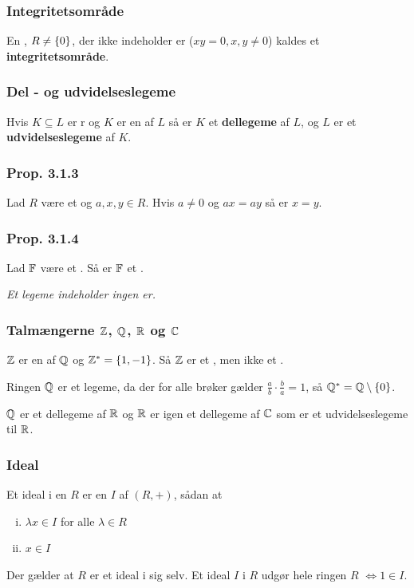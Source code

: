 \subsubsection{Integritetsområde}
\label{Integritetsomraade}
En , $R \neq \{ 0 \}$, der ikke indeholder
er ($xy = 0, x, y \neq 0$) kaldes et
\textbf{integritetsområde}.

\subsubsection{Del - og udvidelseslegeme}
\label{Del - og udvidelseslegeme}
Hvis $K \subseteq L$ er r og $K$ er en  af $L$
så er $K$ et \textbf{dellegeme} af $L$, og $L$ er et \textbf{udvidelseslegeme} af $K$.


\subsubsection{Prop. 3.1.3}
\label{Prop. 3.1.3}
Lad $R$ være et  og $a, x, y \in R$. Hvis $a \neq 0$
og $ax = ay$ så er $x = y$.

\subsubsection{Prop. 3.1.4}
\label{Prop. 3.1.4}
Lad $\mathbb{F}$ være et . Så er $\mathbb{F}$ et .

\textit{Et legeme indeholder ingen er.}

\subsubsection{Talmængerne $\mathbb{Z}$, $\mathbb{Q}$, $\mathbb{R}$ og $\mathbb{C}$}
\label{Talmaengerne_Z_Q_R og C}
$\mathbb{Z}$ er en  af $\mathbb{Q}$ og $\mathbb{Z}^* = \{ 1, -1 \}$. Så $\mathbb{Z}$ er et
, men ikke et .

Ringen $\mathbb{Q}$ er et legeme, da der for alle brøker gælder $\frac{a}{b} \cdot
\frac{b}{a} = 1$, så $\mathbb{Q}^* = \mathbb{Q} \setminus \{ 0 \}$.

$\mathbb{Q}$ er et dellegeme af $\mathbb{R}$ og $\mathbb{R}$ er igen et dellegeme af $\mathbb{C}$ som er et
udvidelseslegeme til $\mathbb{R}$.

\subsubsection{Ideal}
\label{Ideal}
Et ideal i en  $R$ er en  $I$ af $(R, +)$,
sådan at
\begin{enumerate}[(i)]
  \item $\lambda x \in I$ for alle $\lambda \in R$
  \item $x \in I$
\end{enumerate}   
Der gælder at $R$ er et ideal i sig selv. Et ideal $I$ i $R$ udgør hele ringen
$R$ $\iff 1 \in I$.


